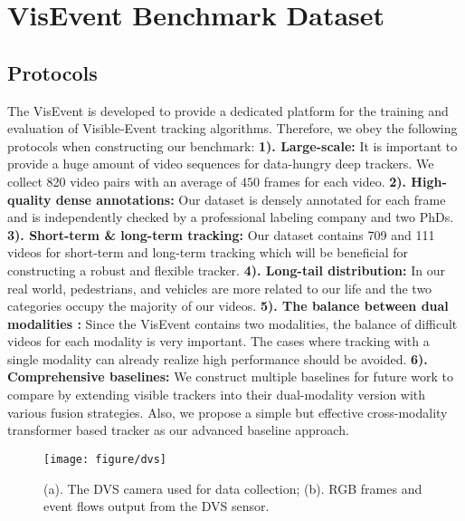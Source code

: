 \documentclass[journal]{IEEEtran}
\begin{document}
\section{VisEvent Benchmark Dataset}  

 
\subsection{Protocols } 
The VisEvent is developed to provide a dedicated platform for the training and evaluation of Visible-Event tracking algorithms. Therefore, we obey the following protocols when constructing our benchmark:
\textbf{1). Large-scale:} It is important to provide a huge amount of video sequences for data-hungry deep trackers. We collect 820 video pairs with an average of $450$ frames for each video. 
\textbf{2). High-quality dense annotations:} Our dataset is densely annotated for each frame and is independently checked by a professional labeling company and two PhDs.    
\textbf{3). Short-term \& long-term tracking:} Our dataset contains 709 and 111 videos for short-term and long-term tracking which will be beneficial for constructing a robust and flexible tracker. 
\textbf{4). Long-tail distribution:} In our real world, pedestrians, and vehicles are more related to our life and the two categories occupy the majority of our videos. 
\textbf{5). The balance between dual modalities :} Since the VisEvent contains two modalities, the balance of difficult videos for each modality is very important. The cases where tracking with a single modality can already realize high performance should be avoided.  
\textbf{6). Comprehensive baselines:} We construct multiple baselines for future work to compare by extending visible trackers into their dual-modality version with various fusion strategies. Also, we propose a simple but effective cross-modality transformer based tracker as our advanced baseline approach. 



\begin{figure} 
\center
\texttt{[image: figure/dvs]}
\caption{ (a). The DVS camera used for data collection;  (b). RGB frames and event flows output from the DVS sensor. }
\label{dvs}
\end{figure} 
\end{document}
